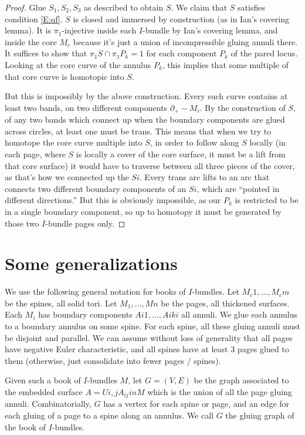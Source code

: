 \documentclass[12pt]{amsart}
\theoremstyle{definition}
\newcommand{\bd}{\partial}
\begin{document}
\begin{proof}
Glue $S_1,S_2,S_3$ as described to obtain $S$. We claim that $S$ satisfies
condition \eqref{E:qf}. $S$ is closed and immersed by construction (as in Ian's
covering lemma). It is $\pi_1$-injective inside each $I$-bundle by Ian's
covering lemma, and inside the core $M_c$ because it's just a union of
incompressible gluing annuli there. It suffices to show that $\pi_1S \cap
\pi_1P_k = 1$ for each component $P_k$ of the pared locus. Looking at the core
curve of the annulus $P_k$, this implies that some multiple of that core curve
is homotopic into $S$.

But this is impossibly by the above construction. Every such curve contains at
least two bands, on two different components $\bd_+-M_i$. By the construction
of $S$, of any two bands which connect up when the boundary components are
glued across circles, at least one must be trans. This means that when we try
to homotope the core curve multiple into $S$, in order to follow along $S$
locally (in each page, where $S$ is locally a cover of the core surface, it
must be a lift from that core surface) it would have to traverse between all
three pieces of the cover, as that's how we connected up the $Si$. Every trans
arc lifts to an arc that connects two different boundary components of an $Si$,
which are ``pointed in different directions.'' But this is obviously
impossible, as our $P_k$ is restricted to be in a single boundary component, so
up to homotopy it must be generated by those two $I$-bundle pages only.

\end{proof}

\section{Some generalizations}

We use the following general notation for books of $I$-bundles. Let
$M_c1,...,M_cm$ be the spines, all solid tori. Let $M_1,...,Mn$ be the pages,
all thickened surfaces. Each $M_i$ has boundary components $Ai1,...,Aiki$ all
annuli. We glue each annulus to a boundary annulus on some spine. For each
spine, all these gluing annuli must be disjoint and parallel. We can assume
without loss of generality that all pages have negative Euler characteristic,
and all spines have at least
3 pages glued to them (otherwise, just consolidate into fewer pages / spines).

Given such a book of $I$-bundles $M$, let $G=(V,E)$ be the graph associated to
the embedded surface $A = Ui,j A_{ij} in M$ which is the union of all the page
gluing annuli. Combinatorially, $G$ has a vertex for each spine or page, and an
edge for each gluing of a page to a spine along an annulus. We call $G$ the
gluing graph of the book of $I$-bundles.
\end{document}
